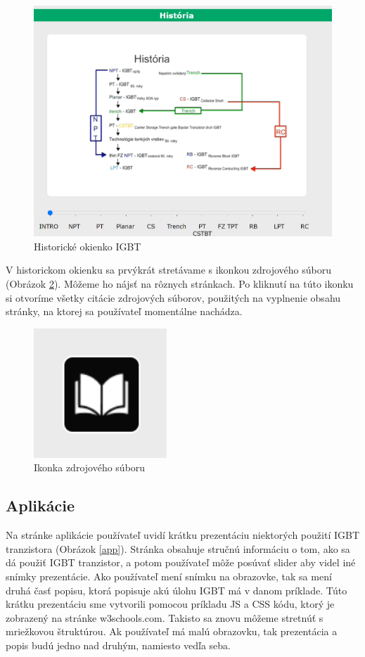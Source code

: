 \newpage

\begin{figure}[!htbp]
    \centering
    \includegraphics[width=16cm]{img/history.PNG}
    \caption{Historické okienko IGBT}
    \label{history}
\end{figure}

V historickom okienku sa prvýkrát stretávame s ikonkou zdrojového súboru (Obrázok \ref{src}). Môžeme ho nájsť na rôznych stránkach. Po kliknutí na túto ikonku si otvoríme všetky citácie zdrojových súborov, použitých na vyplnenie obsahu stránky, na ktorej sa používateľ momentálne nachádza.

\begin{figure}[!htbp]
    \centering
    \includegraphics[width=5cm]{img/src.PNG}
    \caption{Ikonka zdrojového súboru}
    \label{src}
\end{figure}

\subsection{Aplikácie}
\noindent Na stránke aplikácie používateľ uvidí krátku prezentáciu niektorých použití \acrshort{IGBT} tranzistora (Obrázok \ref{app}). Stránka obsahuje stručnú informáciu o tom, ako sa dá použiť \acrshort{IGBT} tranzistor, a potom používateľ môže posúvať slider aby videl iné snímky prezentácie. Ako používateľ mení snímku na obrazovke, tak sa mení druhá časť popisu, ktorá popisuje akú úlohu \acrshort{IGBT} má v danom príklade. Túto krátku prezentáciu sme vytvorili pomocou príkladu JS a CSS kódu, ktorý je zobrazený na stránke w3schools.com. Takisto sa znovu môžeme stretnúť s mriežkovou štruktúrou. Ak používateľ má malú obrazovku, tak prezentácia a popis budú jedno nad druhým, namiesto vedľa seba.

